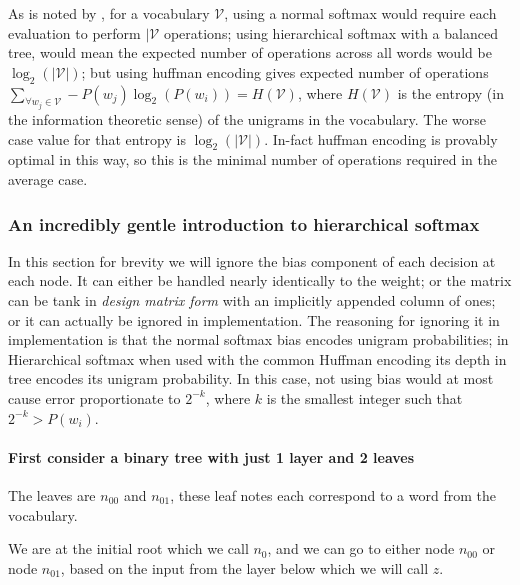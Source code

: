 \documentclass[parskip]{komatufte}
\begin{document}
As is noted by , for a vocabulary $\mathcal{V}$,
using a normal softmax would require each evaluation to perform $|\mathcal{V}$ operations;
using hierarchical softmax with a balanced tree, would mean the expected number of operations across all words would be $\log_2(|\mathcal{V}|)$;
but using huffman encoding gives expected number of operations $\sum_{\forall w_j \in \mathcal{V}} -P(w_j)\log_2(P(w_i)) = H(\mathcal{V})$, where $H(\mathcal{V})$ is the entropy (in the information theoretic sense) of the unigrams in the vocabulary.
The worse case value for that entropy is $\log_2(|\mathcal{V}|)$.
In-fact huffman encoding is provably optimal in this way, so this is the minimal number of operations required in the average case.


\subsubsection{An incredibly gentle introduction to hierarchical softmax}

In this section for brevity we will ignore the bias component of each decision at each node.
It can either be handled nearly identically to the weight;
or the matrix can be tank in \emph{design matrix form} with an implicitly appended column of ones;
or it can actually be ignored in implementation.
The reasoning for ignoring it in implementation is that the normal softmax bias encodes unigram probabilities;
in Hierarchical softmax when used with the common Huffman encoding its depth in tree encodes its unigram probability. In this case, not using bias would at most cause error proportionate to $2^{-k}$, where $k$ is the smallest integer such that $2^{-k}>P(w_i)$.


\paragraph{First consider a binary tree with just 1 layer and 2 leaves}
The leaves are $n_{00}$ and $n_{01}$, these leaf notes each correspond to a word from the vocabulary.


	
We are at the initial root which we call $n_{0}$, and we can go to
either node $n_{00}$ or node $n_{01}$, based on the input from the
layer below which we will call $z$.
\end{document}
